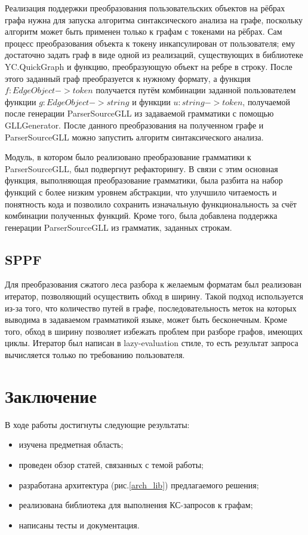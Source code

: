 \documentclass[14pt]{matmex-diploma-custom}
\begin{document}
    Реализация поддержки преобразования пользовательских объектов на рёбрах графа нужна для запуска алгоритма синтаксического анализа на графе, поскольку алгоритм может быть применен только к графам с токенами на рёбрах. Сам процесс преобразования объекта к токену инкапсулирован от пользователя; ему достаточно задать граф в виде одной из реализаций, существующих в библиотеке YC.QuickGraph и функцию, преобразующую объект на ребре в строку. После этого заданный граф преобразуется к нужному формату, а функция \(f: EdgeObject -> token\) получается путём комбинации заданной пользователем функции \(g: EdgeObject -> string\) и функции \(u: string -> token\), получаемой после генерации ParserSourceGLL из задаваемой грамматики с помощью GLLGenerator. После данного преобразования на полученном графе и ParserSourceGLL можно запустить алгоритм синтаксического анализа.
    
    Модуль, в котором было реализовано преобразование грамматики к ParserSourceGLL, был подвергнут рефакторингу. В связи с этим основная функция, выполняющая преобразование грамматики, была разбита на набор функций с более низким уровнем абстракции, что улучшило читаемость и понятность кода и позволило сохранить изначальную функциональность за счёт комбинации полученных функций. Кроме того, была добавлена поддержка генерации ParserSourceGLL из грамматик, заданных строкам.
    
    \subsection{SPPF}
    Для преобразования сжатого леса разбора к желаемым форматам был реализован итератор, позволяющий осуществить обход в ширину. Такой подход используется из-за того, что количество путей в графе, последовательность меток на которых выводима в задаваемом грамматикой языке, может быть бесконечным. Кроме того, обход в ширину позволяет избежать проблем при разборе графов, имеющих циклы. Итератор был написан в lazy-evaluation стиле, то есть результат запроса вычисляется только по требованию пользователя.  
    
    
\section{Заключение}
В ходе работы достигнуты следующие результаты:
\begin{itemize}
    \item изучена предметная область;
    \item проведен обзор статей, связанных с темой работы;
    \item разработана архитектура (рис.\ref{arch_lib}) предлагаемого решения;
    \item реализована библиотека для выполнения КС-запросов к графам;
    \item написаны тесты и документация.
\end{itemize}

\setmonofont[Mapping=tex-text]{CMU Typewriter Text}


\end{document}
